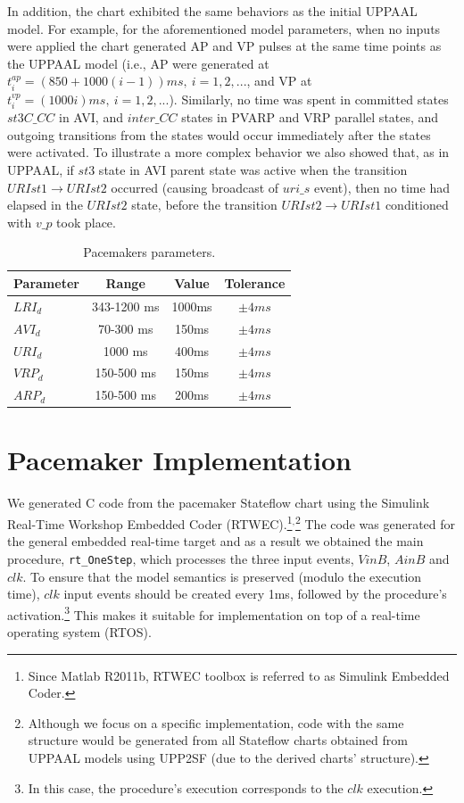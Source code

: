 In addition, the chart exhibited the same behaviors as the initial UPPAAL model. For example, for the aforementioned model parameters, when no inputs were applied the chart generated AP and VP pulses at the same time points as the UPPAAL model (i.e., AP were generated at  $t^{ap}_i=(850+1000(i-1))ms,~i=1,2, ...$, and VP at $t^{vp}_i=(1000i)ms,~i=1,2, ...$). 
Similarly, no time was spent in committed states $st3C\_CC$ in AVI, and $inter\_CC$ states in PVARP and VRP parallel states, and outgoing transitions from the states would occur immediately after the states were activated. To illustrate a more complex behavior we also showed that, as in UPPAAL, if $st3$ state in AVI parent state was active when the transition $URIst1\rightarrow URIst2$ occurred (causing broadcast of $uri\_s$ event), then no time had elapsed in the $URIst2$ state, before the transition $URIst2\rightarrow URIst1$ conditioned with $v\_p$ took place.


\begin{table}[!b]

{
\begin{tabular}{|l|c|c|c|}
\hline
Parameter & Range & Value & Tolerance \\ 
\hline
$LRI_{d}$ & 343-1200 ms & 1000ms & $\pm 4ms$  \\\hline
$AVI_{d}$ & 70-300 ms   &  150ms & $\pm 4ms$  \\\hline
$URI_{d}$ & 1000 ms     &  400ms & $\pm 4ms$  \\\hline
$VRP_{d}$ & 150-500 ms  &  150ms & $\pm 4ms$  \\\hline
$ARP_{d}$ & 150-500 ms  &  200ms & $\pm 4ms$  \\\hline
\end{tabular}}
\caption{Pacemakers parameters.
}
\label{tab:params}
\end{table}

\section{Pacemaker Implementation}
\label{sec:code}


We generated C code from the pacemaker Stateflow chart using the Simulink Real-Time Workshop Embedded Coder (RTWEC).\footnote{Since Matlab R2011b, RTWEC toolbox is referred to as Simulink Embedded Coder.}$^,$\footnote{Although we focus on a specific implementation, code with the same structure would be generated from all Stateflow charts obtained from UPPAAL models using UPP2SF (due to the derived charts' structure).} 
The code was generated for the general embedded real-time target and as a result we obtained the main procedure, \texttt{rt\_OneStep}, which processes the three input events, $VinB$, $AinB$ and $clk$. To ensure that the model semantics is preserved (modulo the execution time), $clk$ input events should be created every 1ms, followed by the procedure's activation.\footnote{In this case, the procedure's execution corresponds to the $clk$ execution.}  This makes it suitable for implementation on top of a real-time operating system (RTOS).

